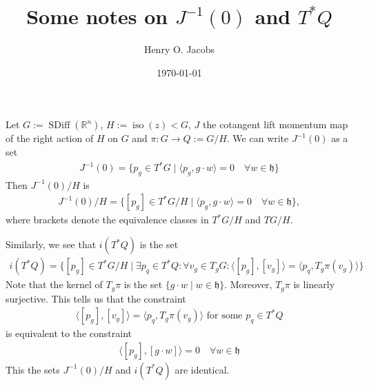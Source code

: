 \documentclass[12pt]{amsart}
\title{Some notes on $J^{-1}(0)$ and $T^*Q$}
\author{Henry O. Jacobs}
\date{\today}
\DeclareMathOperator{\SDiff}{SDiff}
\DeclareMathOperator{\iso}{iso}
\begin{document}
\maketitle

Let $G := \SDiff(\mathbb{R}^n)$, $H := \iso(z) < G$, $J$ the cotangent
lift momentum map of the right action of $H$ on $G$ and
$\pi\colon G \to Q := G/H$. We can write $J^{-1}(0)$ as a set
\begin{align*}
	J^{-1}(0) = \{ p_g \in T^*G \mid \langle p_g , g \cdot w \rangle = 0 \quad \forall w \in \mathfrak{h} \}
\end{align*}
Then $J^{-1}(0) / H$ is
\begin{align*}
	J^{-1}(0) / H = \{ [p_g] \in T^*G/H \mid  \langle p_g , g \cdot w \rangle = 0 \quad \forall w \in \mathfrak{h} \},
\end{align*}
where brackets denote the equivalence classes in $T^*G/H$ and $TG/H$.

Similarly, we see that $i(T^*Q)$ is the set
\begin{align*}
	i(T^*Q) = \{ [p_g] \in T^*G/H \mid \exists p_q \in T^*Q\colon \forall v_g \in T_g G\colon \langle [p_g] , [v_g] \rangle = \langle p_q , T_g\pi(v_g) \rangle \}
\end{align*}
Note that the kernel of $T_g\pi$ is the set $\{ g \cdot w \mid w \in \mathfrak{h}\}$.
Moreover, $T_g \pi$ is linearly surjective.
This tells us that the constraint
\begin{align*}
	\langle [p_g] , [v_g] \rangle = \langle p_q , T_g\pi(v_g) \rangle \text{ for some } p_q \in T^*Q
\end{align*}
is equivalent to the constraint
\begin{align*}
	\langle [p_g], [g \cdot w] \rangle = 0 \quad \forall w \in \mathfrak{h}
\end{align*}
This the sets $J^{-1}(0) / H $ and $i(T^*Q)$ are identical.

\vspace{1cm}
\end{document}
